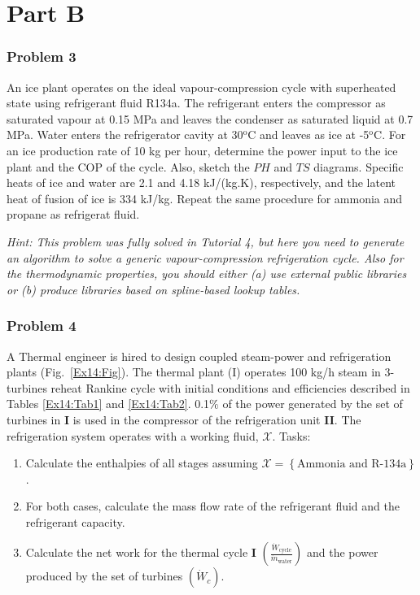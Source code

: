 
\section{Part B}


\subsubsection*{Problem 3}
An ice plant operates on the ideal vapour-compression cycle with superheated state using refrigerant fluid R134a.  The refrigerant enters the compressor as saturated vapour at 0.15 MPa and leaves the condenser as saturated liquid at 0.7 MPa.  Water enters the refrigerator cavity at 30$^{\text{o}}$C and leaves as ice at -5$^{\text{o}}$C. For an ice production rate of 10 kg per hour, determine the power input to the ice plant and the COP of the cycle. Also, sketch the $PH$ and $TS$ diagrams. Specific heats of ice and water are 2.1 and 4.18 kJ/(kg.K), respectively, and the latent heat of fusion of ice is 334 kJ/kg. Repeat the same procedure for ammonia and propane as refrigerat fluid. 

{\it Hint: This problem was fully solved in Tutorial 4, but here you need to generate an algorithm to solve a generic vapour-compression refrigeration cycle. Also for the thermodynamic properties, you should either (a) use external public libraries or (b) produce libraries based on spline-based lookup tables.}


 

\subsubsection*{Problem 4}
A Thermal engineer is hired to design coupled steam-power and refrigeration plants (Fig.~\ref{Ex14:Fig}). The thermal plant (I) operates 100 kg/h steam in 3-turbines reheat Rankine cycle with initial conditions and efficiencies described in Tables \ref{Ex14:Tab1} and \ref{Ex14:Tab2}. 0.1$\%$ of the power generated by the set of turbines in {\bf I} is used in the compressor of the refrigeration unit {\bf II}. The refrigeration system operates with a working fluid, $\mathcal{X}$. Tasks:
\begin{enumerate}
\item Calculate the enthalpies of all stages assuming $\mathcal{X}=\left\{\text{Ammonia and R-134a}\right\}$. 
\item For both cases, calculate the mass flow rate of the refrigerant fluid and the refrigerant capacity. 
\item Calculate the net work for the thermal cycle {\bf I} $\left(\displaystyle\frac{\dot{W}_{\text{cycle}}}{\dot{m}_{\text{water}}}\right)$ and the power produced by the set of turbines $\left(\dot{W}_{c}\right)$.
\end{enumerate}

